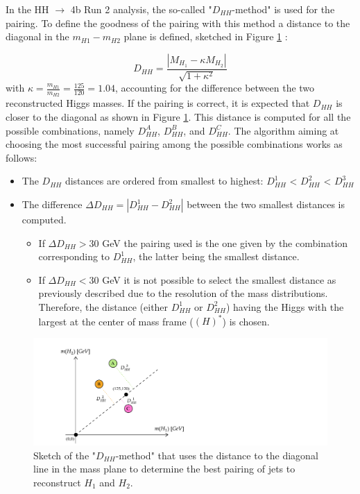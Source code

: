In the HH $\to$ 4b Run 2 analysis, the so-called "$D_{HH}$-method" is used for the pairing. To define the goodness of the pairing with this method a distance to the diagonal in the $m_{H1}-m_{H2}$ plane is defined, sketched in Figure \ref{fig: diagonal method} \cite{ANRun2}:

\begin{equation}
    D_{HH}=\frac{|M_{H_1}- \kappa M_{H_2}|}{\sqrt{1+\kappa^2}}
    \label{eq: dist dhh}
\end{equation}
\noindent with $\kappa=\frac{m_{H1}}{m_{H2}}=\frac{125}{120}=1.04$, accounting for the difference between the two reconstructed Higgs masses. If the pairing is correct, it is expected that $D_{HH}$ is closer to the diagonal as shown in Figure \ref{fig: diagonal method}. This distance is computed for all the possible combinations, namely $D_{HH}^A$, $D_{HH}^B$, and $D_{HH}^C$. The algorithm aiming at choosing the most successful pairing among the possible combinations works as follows:
\begin{itemize}
    \item The $D_{HH}$ distances are ordered from smallest to highest: $D^1_{HH}$ < $D^2_{HH}$ < $D^3_{HH}$
    \item The difference $\Delta D_{HH}= |D_{HH}^1- D_{HH}^2|$ between the two smallest distances is computed.
        \begin{itemize}
            \item If $\Delta D_{HH} > 30$ GeV the pairing used is the one given by the combination corresponding to $D_{HH}^1$, the latter being the smallest distance.
            \item If $\Delta D_{HH} < 30$ GeV it is not possible to select the smallest distance as previously described due to the resolution of the mass distributions. Therefore, the distance (either $D_{HH}^1$ or $D_{HH}^2$) having the Higgs with the largest \pt at the center of mass frame (\pt$(H)^*$) is chosen.
        \end{itemize}
\end{itemize}

\begin{figure}
    \centering
    \includegraphics[width=0.7\linewidth]{Images/4.HH4b Analysis/DHH method/Dhh method.pdf}
    \caption{Sketch of the "$D_{HH}$-method" that uses the distance to the diagonal line in the mass plane to determine the best pairing of jets to reconstruct $H_1$ and $H_2$.}
    \label{fig: diagonal method}
\end{figure}


